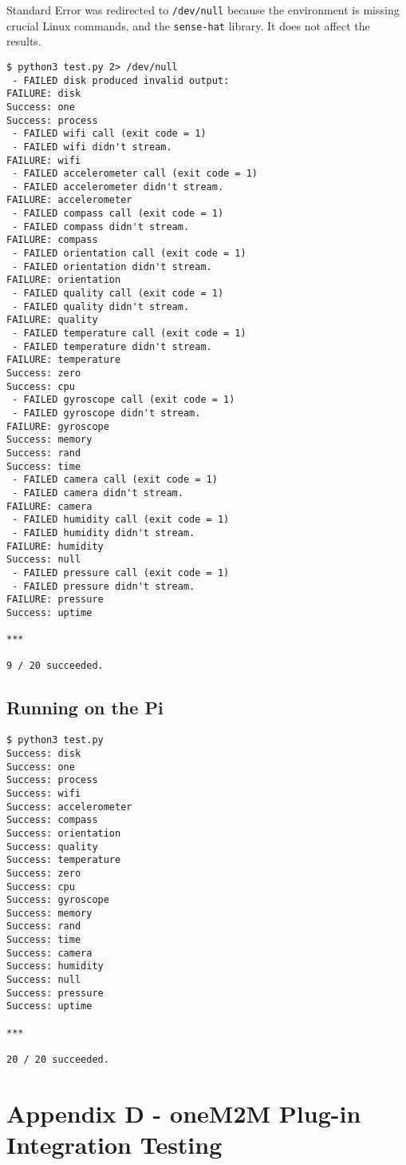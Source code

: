 Standard Error was redirected to \lstinline{/dev/null} because the environment is missing crucial Linux commands, and the \lstinline{sense-hat} library. It does not affect the results.\\

\begin{lstlisting}
$ python3 test.py 2> /dev/null
 - FAILED disk produced invalid output:
FAILURE: disk
Success: one
Success: process
 - FAILED wifi call (exit code = 1)
 - FAILED wifi didn't stream.
FAILURE: wifi
 - FAILED accelerometer call (exit code = 1)
 - FAILED accelerometer didn't stream.
FAILURE: accelerometer
 - FAILED compass call (exit code = 1)
 - FAILED compass didn't stream.
FAILURE: compass
 - FAILED orientation call (exit code = 1)
 - FAILED orientation didn't stream.
FAILURE: orientation
 - FAILED quality call (exit code = 1)
 - FAILED quality didn't stream.
FAILURE: quality
 - FAILED temperature call (exit code = 1)
 - FAILED temperature didn't stream.
FAILURE: temperature
Success: zero
Success: cpu
 - FAILED gyroscope call (exit code = 1)
 - FAILED gyroscope didn't stream.
FAILURE: gyroscope
Success: memory
Success: rand
Success: time
 - FAILED camera call (exit code = 1)
 - FAILED camera didn't stream.
FAILURE: camera
 - FAILED humidity call (exit code = 1)
 - FAILED humidity didn't stream.
FAILURE: humidity
Success: null
 - FAILED pressure call (exit code = 1)
 - FAILED pressure didn't stream.
FAILURE: pressure
Success: uptime

***

9 / 20 succeeded.
\end{lstlisting}

\subsection*{Running on the Pi}

\begin{lstlisting}
$ python3 test.py
Success: disk
Success: one
Success: process
Success: wifi
Success: accelerometer
Success: compass
Success: orientation
Success: quality
Success: temperature
Success: zero
Success: cpu
Success: gyroscope
Success: memory
Success: rand
Success: time
Success: camera
Success: humidity
Success: null
Success: pressure
Success: uptime

***

20 / 20 succeeded.
\end{lstlisting}

\section{Appendix D - oneM2M Plug-in Integration Testing}

